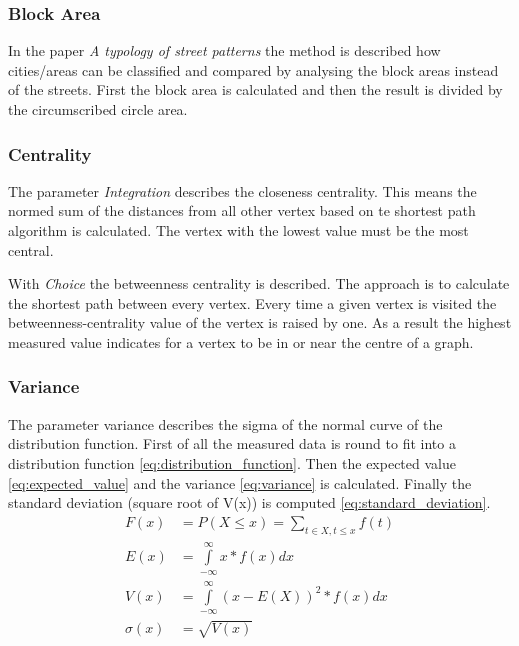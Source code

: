 \subsubsection{Block Area}
In the paper \textit{A typology of street patterns}\citep{blockArea:2014} the method is described how cities/areas can be classified and compared by analysing the block areas instead of the streets. First the block area is calculated and then the result is divided by the circumscribed circle area.

\subsubsection{Centrality}
The parameter \textit{Integration} describes the closeness centrality. This means the normed sum of the distances from all other vertex based on te shortest path algorithm is calculated. The vertex with the lowest value must be the most central.

With \textit{Choice} the betweenness centrality is described. The approach is to calculate the shortest path between every vertex. Every time a given vertex is visited the betweenness-centrality value of the vertex is raised by one. As a result the highest measured value indicates for a vertex to be in or near the centre of a graph.

\subsubsection{Variance}
The parameter variance describes the sigma of the normal curve of the distribution function.
First of all the measured data is round to fit into a distribution function \ref{eq:distribution_function}. Then the expected value \ref{eq:expected_value} and the variance \ref{eq:variance} is calculated. Finally the standard deviation (square root of V(x)) is computed \ref{eq:standard_deviation}.
\begin{align}
\label{eq:distribution_function} 
F(x) &= P(X \leq x) =  \sum_{t\in{X}, t\leq{x}}{f(t)} \\
\label{eq:expected_value} 
E(x) &= \int\limits_{-\infty}^\infty x * f(x)dx \\
\label{eq:variance} 
V(x) &= \int\limits_{-\infty}^\infty (x - E(X))^2 * f(x)dx \\
\label{eq:standard_deviation} 
\sigma(x) &= \sqrt{V(x)}
\end{align}

